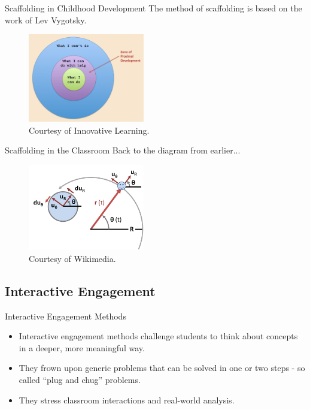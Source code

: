 \documentclass{beamer}
\begin{document}
\begin{frame}{Scaffolding in Childhood Development}
The method of scaffolding is based on the work of Lev Vygotsky.
  \begin{figure}
  \centering
    \includegraphics[width=2in]{img/presentation/zpd}
    \caption{Courtesy of Innovative Learning.}
  \end{figure}
\end{frame}

\begin{frame}{Scaffolding in the Classroom}
Back to the diagram from earlier...
\vspace{5mm}
  \begin{figure}
  \centering
    \includegraphics[width=2in]{img/presentation/vectors}
    \caption{Courtesy of Wikimedia.}
  \end{figure}
\end{frame}

\subsection*{Interactive Engagement}

\begin{frame}{Interactive Engagement Methods}
\begin{itemize}
\item Interactive engagement methods challenge students to think about concepts in a deeper, more meaningful way.
\item They frown upon generic problems that can be solved in one or two steps - so called ``plug and chug'' problems. 
\item They stress classroom interactions and real-world analysis.
\end{itemize}
\end{frame}
\end{document}
